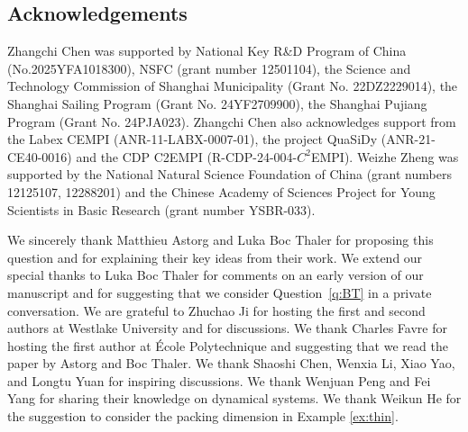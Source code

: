 \documentclass[12pt,centertags,oneside]{amsart}
\theoremstyle{definition}
\begin{document}
\subsection*{Acknowledgements} Zhangchi Chen was supported by National Key 
R\&D Program of China (No.2025YFA1018300), NSFC (grant number 12501104), 
the Science and Technology Commission of Shanghai Municipality (Grant No. 
22DZ2229014), the Shanghai Sailing Program (Grant No. 24YF2709900), the 
Shanghai Pujiang Program (Grant No. 24PJA023). Zhangchi Chen also 
acknowledges support from the Labex CEMPI (ANR-11-LABX-0007-01), the 
project QuaSiDy (ANR-21-CE40-0016) and the CDP C2EMPI 
(R-CDP-24-004-$C^2$EMPI). Weizhe Zheng was supported by the National 
Natural Science Foundation of China (grant numbers 12125107, 12288201) and 
the Chinese Academy of Sciences Project for Young Scientists in Basic 
Research (grant number YSBR-033). 

We sincerely thank Matthieu Astorg and Luka Boc Thaler for proposing this 
question and for explaining their key ideas from their work. We extend our 
special thanks to Luka Boc Thaler for comments on an early version of our 
manuscript and for suggesting that we consider Question~\ref{q:BT} in a 
private conversation. We are grateful to Zhuchao Ji for hosting the first 
and second authors at Westlake University and for discussions. We thank 
Charles Favre for hosting the first author at {\'E}cole Polytechnique and 
suggesting that we read the paper by Astorg and Boc Thaler. We thank 
Shaoshi Chen, Wenxia Li, Xiao Yao, and Longtu Yuan for inspiring 
discussions. We thank Wenjuan Peng and Fei Yang for sharing their knowledge 
on dynamical systems. We thank Weikun He for the suggestion to consider the 
packing dimension in Example \ref{ex:thin}. 
\end{document}
